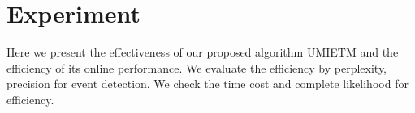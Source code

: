 \documentclass[runningheads,a4paper]{llncs}
\begin{document}
\section{Experiment}
Here we present the effectiveness of our proposed algorithm UMIETM and the efficiency of its online performance.
We evaluate the efficiency by perplexity, precision for event detection. 
We check the time cost and complete likelihood for efficiency.
\end{document}
